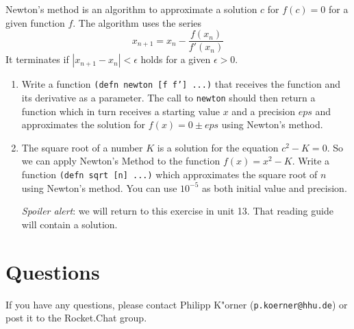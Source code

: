 \documentclass[11pt,a4paper]{article}
\begin{document}
\begin{exercise}
Newton's method is an algorithm to approximate a solution $c$ for $f(c)=0$ for a given function $f$.
The algorithm uses the series $$x_{n+1} = x_{n} - \frac{f(x_n)}{f'(x_n)}$$
It terminates if  $|x_{n+1} - x_n| < \epsilon$ holds for a given $\epsilon > 0$.

\begin{enumerate}[label=\alph*)]

  \item Write a function \texttt{(defn newton [f f'] ...)} that receives the function and its derivative as a parameter. The call to \texttt{newton} should then return a function which in turn receives a starting value $x$ and a precision $eps$ and approximates the solution for $f(x)=0 \pm eps$ using Newton's method.
  
   \item The square root of a number $K$ is a solution for the equation $c^2 - K = 0$. So we can apply Newton's Method to the function $f(x) = x^2 - K$. Write a function \texttt{(defn sqrt [n] ...)} which approximates the square root of $n$ using Newton's method. You can use $10^{-5}$ as both initial value and precision.
    


\emph{Spoiler alert}: we will return to this exercise in unit 13.
That reading guide will contain a solution.

\end{enumerate}
\end{exercise}

	\section*{Questions}
	If you have any questions, please contact Philipp K"orner (\texttt{p.koerner@hhu.de}) or post it to the Rocket.Chat group.
\end{document}
